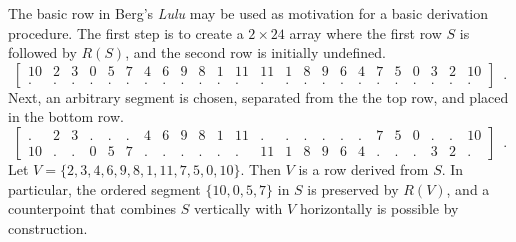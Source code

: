 \begin{example}
The basic row in Berg's \emph{Lulu} \cite[182]{Starr1984} may be used as motivation for a basic derivation procedure. The first step is to create a $2 \times 24$ array where the first row $S$ is followed by $R(S)$, and the second row is initially undefined.
\begin{equation}
    \left[
    \begin{array}{cccccccccccc|cccccccccccc}
    10 & 2 & 3 & 0 & 5 & 7 & 4 & 6 & 9 & 8 & 1 & 11 & 11 & 1 & 8 & 9 & 6 & 4 & 7 & 5 & 0 & 3 & 2 & 10 \\
    . & . & . & . & . & . & . & . & . & . & . & . & . & . & . & . & . & . & . & . & . & . & . & .
    \end{array}
    \right] \enspace.
\end{equation}
Next, an arbitrary segment is chosen, separated from the the top row, and placed in the bottom row.
\begin{equation}
    \left[
    \begin{array}{cccccccccccc|cccccccccccc}
    . & 2 & 3 & . & . & . & 4 & 6 & 9 & 8 & 1 & 11 & . & . & . & . & . & . & 7 & 5 & 0 & . & . & 10 \\
    10 & . & . & 0 & 5 & 7 & . & . & . & . & . & . & 11 & 1 & 8 & 9 & 6 & 4 & . & . & . & 3 & 2 & .
    \end{array}
    \right] \enspace.
\end{equation}
Let $V = \{ 2, 3, 4, 6, 9, 8, 1, 11, 7, 5, 0, 10 \}$. Then $V$ is a row derived from $S$. In particular, the ordered segment $\{ 10, 0, 5, 7 \}$ in $S$ is preserved by $R(V)$, and a counterpoint that combines $S$ vertically with $V$ horizontally is possible by construction.
\label{ex:derivation}
\end{example}

